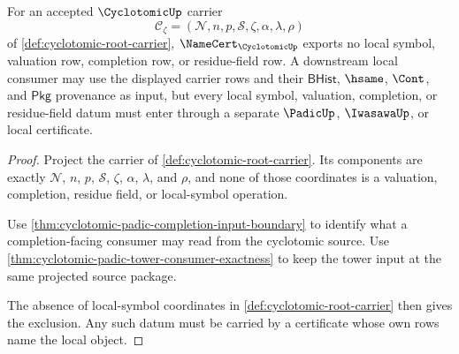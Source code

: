 \begin{theorem}
\label{thm:cyclotomic-local-symbol-exclusion}
For an accepted $\CyclotomicUp$ carrier
$$
\mathcal{C}_{\zeta}=(\mathcal{N},n,p,\mathcal{S},\zeta,\alpha,\lambda,\rho)
$$
of \autoref{def:cyclotomic-root-carrier}, $\NameCert_{\CyclotomicUp}$ exports no local symbol, valuation row, completion row, or residue-field row. A downstream local consumer may use the displayed carrier rows and their $\mathsf{BHist}$, $\hsame$, $\Cont$, and $\mathsf{Pkg}$ provenance as input, but every local symbol, valuation, completion, or residue-field datum must enter through a separate $\PadicUp$, $\IwasawaUp$, or local certificate.
\end{theorem}
\begin{proof}
Project the carrier of \autoref{def:cyclotomic-root-carrier}. Its components are exactly $\mathcal{N}$, $n$, $p$, $\mathcal{S}$, $\zeta$, $\alpha$, $\lambda$, and $\rho$, and none of those coordinates is a valuation, completion, residue field, or local-symbol operation.

Use \autoref{thm:cyclotomic-padic-completion-input-boundary} to identify what a completion-facing consumer may read from the cyclotomic source. Use \autoref{thm:cyclotomic-padic-tower-consumer-exactness} to keep the tower input at the same projected source package.

The absence of local-symbol coordinates in \autoref{def:cyclotomic-root-carrier} then gives the exclusion. Any such datum must be carried by a certificate whose own rows name the local object.
\end{proof}


